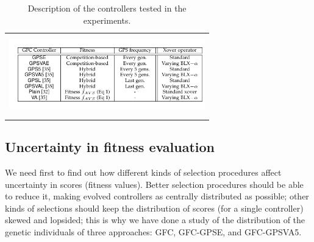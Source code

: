 \documentclass[10pt,journal,compsoc]{IEEEtran}
\begin{document}

\begin{table}[!htp]
	\centering
	{\scriptsize
		\caption{{\scriptsize Description of the controllers tested in the experiments.}}
		{
			\begin{tabular}{c}
			\includegraphics[width=8.5cm, height=3.5cm, clip=true, trim=0cm 0cm 0cm 0cm]{fig/table2.pdf} 
%
%
%
%
%
			\end{tabular}
		}\label{tab:drivers}
	}
\end{table}
%


\subsection{Uncertainty in fitness evaluation}

We need first to find out how different  kinds of selection procedures
affect uncertainty in scores (fitness values). Better selection procedures should be able to reduce it, making evolved controllers as centrally distributed
as possible; other kinds of selections should keep  the distribution of
scores (for a single controller) skewed and lopsided; this is why we
have done a study of the distribution of the genetic individuals of
three approaches: {\sf GFC}, {\sf GFC-GPSE}, and {\sf GFC-GPSVA5}. 
\end{document}
